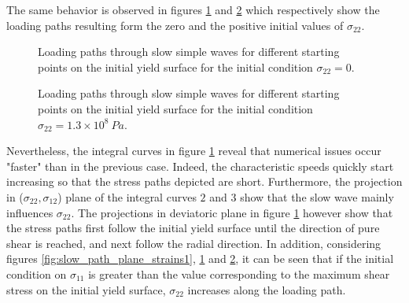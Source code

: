 The same behavior is observed in figures \ref{fig:slow_path_plane_strains2} and \ref{fig:slow_path_plane_strains3} which respectively show the loading paths resulting form the zero and the positive initial values of $\sigma_{22}$.
\begin{figure}[h!]
  \centering
  {}
  {}
  \caption{Loading paths through slow simple waves for different starting points on the initial yield surface for the initial condition $\sigma_{22}=0$.}
  \label{fig:slow_path_plane_strains2}
\end{figure}
\begin{figure}[h!]
  \centering
  {}
  {}
  \caption{Loading paths through slow simple waves for different starting points on the initial yield surface for the initial condition $\sigma_{22}=1.3 \times 10^{8} \: Pa$.}
  \label{fig:slow_path_plane_strains3}
\end{figure}
Nevertheless, the integral curves in figure \ref{fig:slow_path_plane_strains2} reveal that numerical issues occur "faster" than in the previous case.
Indeed, the characteristic speeds quickly start increasing so that the stress paths depicted are short.
Furthermore, the projection in ($\sigma_{22},\sigma_{12}$) plane of the integral curves $2$ and $3$ show that the slow wave mainly influences $\sigma_{22}$.
The projections in deviatoric plane in figure \ref{fig:slow_path_plane_strains2} however show that the stress paths first follow the initial yield surface until the direction of pure shear is reached, and next follow the radial direction.
In addition, considering figures \ref{fig:slow_path_plane_strains1}, \ref{fig:slow_path_plane_strains2} and \ref{fig:slow_path_plane_strains3}, it can be seen that if the initial condition on $\sigma_{11}$ is greater than the value corresponding to the maximum shear stress on the initial yield surface, $\sigma_{22}$ increases along the loading path.
